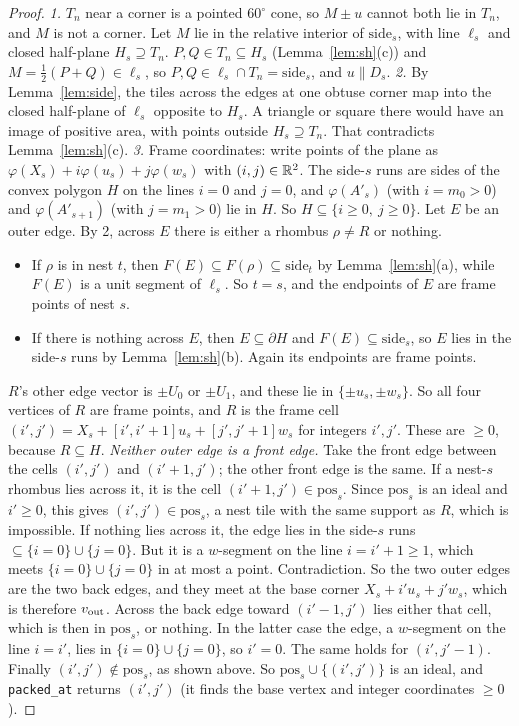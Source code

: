 \documentclass[11pt]{article}
\theoremstyle{definition}\newtheorem{definition}[theorem]{Definition}\newtheorem{remark}[theorem]{Remark}
\begin{document}
\begin{proof}
\emph{1.} $T_n$ near a corner is a pointed $60^\circ$ cone, so $M\pm u$ cannot both lie in $T_n$, and $M$ is not a corner. Let $M$ lie in the relative interior of $\mathrm{side}_s$, with line $\ell_s$ and closed half-plane $H_s\supseteq T_n$. $P,Q\in T_n\subseteq H_s$ (Lemma~\ref{lem:sh}(c)) and $M=\tfrac12(P+Q)\in\ell_s$, so $P,Q\in\ell_s\cap T_n=\mathrm{side}_s$, and $u\parallel D_s$.
\emph{2.} By Lemma~\ref{lem:side}, the tiles across the edges at one obtuse corner map into the closed half-plane of $\ell_s$ opposite to $H_s$. A triangle or square there would have an image of positive area, with points outside $H_s\supseteq T_n$. That contradicts Lemma~\ref{lem:sh}(c).
\emph{3.} Frame coordinates: write points of the plane as $\varphi(X_s)+i\varphi(u_s)+j\varphi(w_s)$ with $(i,j)\in\mathbb R^2$. The side-$s$ runs are sides of the convex polygon $H$ on the lines $i=0$ and $j=0$, and $\varphi(A'_s)$ (with $i=m_0>0$) and $\varphi(A'_{s+1})$ (with $j=m_1>0$) lie in $H$. So $H\subseteq\{i\ge0,\ j\ge0\}$.
Let $E$ be an outer edge. By 2, across $E$ there is either a rhombus $\rho\ne R$ or nothing.
\begin{itemize}
\item If $\rho$ is in nest $t$, then $F(E)\subseteq F(\rho)\subseteq\mathrm{side}_t$ by Lemma~\ref{lem:sh}(a), while $F(E)$ is a unit segment of $\ell_s$. So $t=s$, and the endpoints of $E$ are frame points of nest $s$.
\item If there is nothing across $E$, then $E\subseteq\partial H$ and $F(E)\subseteq\mathrm{side}_s$, so $E$ lies in the side-$s$ runs by Lemma~\ref{lem:sh}(b). Again its endpoints are frame points.
\end{itemize}
$R$'s other edge vector is $\pm U_0$ or $\pm U_1$, and these lie in $\{\pm u_s,\pm w_s\}$. So all four vertices of $R$ are frame points, and $R$ is the frame cell $(i',j')=X_s+[i',i'+1]u_s+[j',j'+1]w_s$ for integers $i',j'$. These are $\ge0$, because $R\subseteq H$.
\emph{Neither outer edge is a front edge.} Take the front edge between the cells $(i',j')$ and $(i'+1,j')$; the other front edge is the same. If a nest-$s$ rhombus lies across it, it is the cell $(i'+1,j')\in\mathrm{pos}_s$. Since $\mathrm{pos}_s$ is an ideal and $i'\ge0$, this gives $(i',j')\in\mathrm{pos}_s$, a nest tile with the same support as $R$, which is impossible. If nothing lies across it, the edge lies in the side-$s$ runs $\subseteq\{i=0\}\cup\{j=0\}$. But it is a $w$-segment on the line $i=i'+1\ge1$, which meets $\{i=0\}\cup\{j=0\}$ in at most a point. Contradiction.
So the two outer edges are the two back edges, and they meet at the base corner $X_s+i'u_s+j'w_s$, which is therefore $v_{\rm out}$.
Across the back edge toward $(i'-1,j')$ lies either that cell, which is then in $\mathrm{pos}_s$, or nothing. In the latter case the edge, a $w$-segment on the line $i=i'$, lies in $\{i=0\}\cup\{j=0\}$, so $i'=0$. The same holds for $(i',j'-1)$. Finally $(i',j')\notin\mathrm{pos}_s$, as shown above. So $\mathrm{pos}_s\cup\{(i',j')\}$ is an ideal, and \texttt{packed\_at} returns $(i',j')$ (it finds the base vertex and integer coordinates $\ge0$).
\end{proof}
\end{document}
